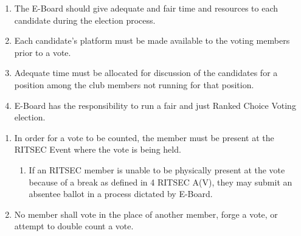 


\begin{enumerate}
  \item The E-Board should give adequate and fair time and resources to each
    candidate during the election process.
  \item Each candidate's platform must be made available to the voting members
    prior to a vote.
  \item Adequate time must be allocated for discussion of the candidates for a
    position among the club members not running for that position.
  \item E-Board has the responsibility to run a fair and just Ranked Choice
    Voting election.
\end{enumerate}


\begin{enumerate}
  \item In order for a vote to be counted, the member must be present at the
    RITSEC Event where the vote is being held.
  \begin{enumerate}
    \item If an RITSEC member is unable to be physically present at the vote
      because of a break as defined in 4 RITSEC A(V), they may submit an
      absentee ballot in a process dictated by E-Board.
  \end{enumerate}
  \item No member shall vote in the place of another member, forge
    a vote, or attempt to double count a vote.
\end{enumerate}



